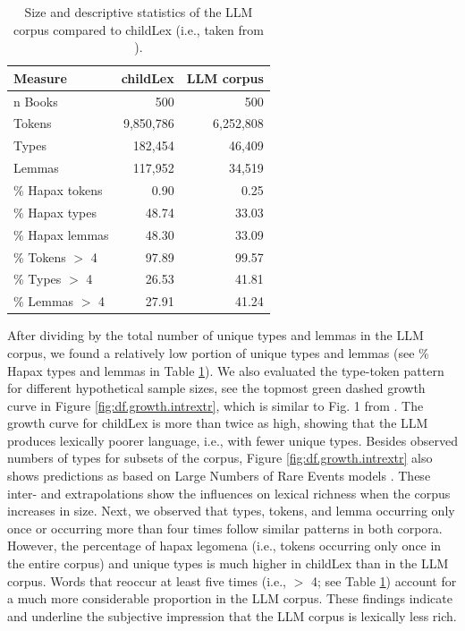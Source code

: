 \documentclass[doc, a4paper]{apa7}
\begin{document}
\begin{table}[!htbp]
\caption{Size and descriptive statistics of the LLM corpus compared to childLex (i.e., taken from \cite{schroeder_childlex_2015}).}
\centering
\begin{tabular}{lrr}
  \hline
Measure & childLex & LLM corpus \\ 
  \hline
n Books & 500 & 500 \\ 
  Tokens & 9,850,786 & 6,252,808 \\ 
  Types & 182,454 & 46,409 \\ 
  Lemmas & 117,952 & 34,519 \\ 
  \% Hapax tokens & 0.90 & 0.25 \\ 
  \% Hapax types & 48.74 & 33.03 \\ 
  \% Hapax lemmas & 48.30 & 33.09 \\ 
  \% Tokens $>$ 4 & 97.89 & 99.57 \\ 
  \% Types $>$ 4 & 26.53 & 41.81 \\ 
  \% Lemmas $>$ 4 & 27.91 & 41.24 \\ 
   \hline
\end{tabular}
\label{freqComp}
\end{table}

After dividing by the total number of unique types and lemmas in the LLM corpus, we found a relatively low portion of unique types and lemmas (see \% Hapax types and lemmas in Table \ref{freqComp}). We also evaluated the type-token pattern for different hypothetical sample sizes, see the topmost green dashed growth curve in Figure \ref{fig:df.growth.intrextr}, which is similar to Fig. 1 from \citep{schroeder_childlex_2015}. The growth curve for childLex is more than twice as high, showing that the LLM produces lexically poorer language, i.e., with fewer unique types. Besides observed numbers of types for subsets of the corpus, Figure \ref{fig:df.growth.intrextr} also shows predictions as based on Large Numbers of Rare Events models \citep{evert_simple_2004, baayen_word_2001}. These inter- and extrapolations show the influences on lexical richness when the corpus increases in size. Next, we observed that types, tokens, and lemma occurring only once or occurring more than four times follow similar patterns in both corpora. However, the percentage of hapax legomena (i.e., tokens occurring only once in the entire corpus) and unique types is much higher in childLex than in the LLM corpus. Words that reoccur at least five times (i.e., $>$ 4; see Table \ref{freqComp}) account for a much more considerable proportion in the LLM corpus. These findings indicate and underline the subjective impression that the LLM corpus is lexically less rich. 
\end{document}
